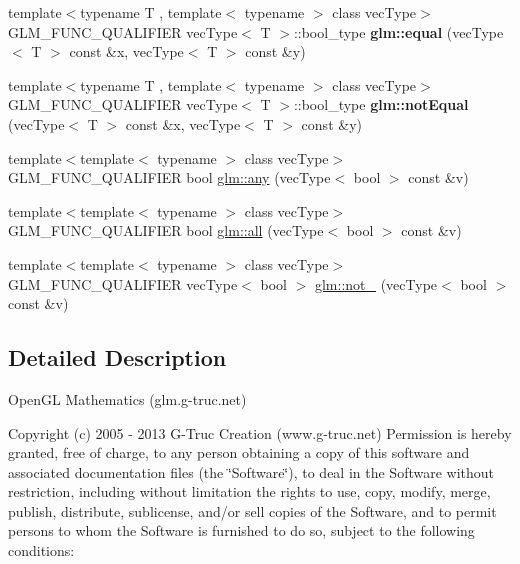 \begin{DoxyCompactItemize}
\item 
\hypertarget{namespaceglm_a8174e161228847c68ded7a51742425e7}{}{\footnotesize template$<$typename T , template$<$ typename $>$ class vec\+Type$>$ }\\G\+L\+M\+\_\+\+F\+U\+N\+C\+\_\+\+Q\+U\+A\+L\+I\+F\+I\+E\+R vec\+Type$<$ T $>$\+::bool\+\_\+type {\bfseries glm\+::equal} (vec\+Type$<$ T $>$ const \&x, vec\+Type$<$ T $>$ const \&y)\label{namespaceglm_a8174e161228847c68ded7a51742425e7}

\item 
\hypertarget{namespaceglm_ab8dd4009e5f297ce53e1132ca4468745}{}{\footnotesize template$<$typename T , template$<$ typename $>$ class vec\+Type$>$ }\\G\+L\+M\+\_\+\+F\+U\+N\+C\+\_\+\+Q\+U\+A\+L\+I\+F\+I\+E\+R vec\+Type$<$ T $>$\+::bool\+\_\+type {\bfseries glm\+::not\+Equal} (vec\+Type$<$ T $>$ const \&x, vec\+Type$<$ T $>$ const \&y)\label{namespaceglm_ab8dd4009e5f297ce53e1132ca4468745}

\item 
{\footnotesize template$<$template$<$ typename $>$ class vec\+Type$>$ }\\G\+L\+M\+\_\+\+F\+U\+N\+C\+\_\+\+Q\+U\+A\+L\+I\+F\+I\+E\+R bool \hyperlink{group__core__func__vector__relational_gacbbe64772c2d950bd806eac4f12f8823}{glm\+::any} (vec\+Type$<$ bool $>$ const \&v)
\item 
{\footnotesize template$<$template$<$ typename $>$ class vec\+Type$>$ }\\G\+L\+M\+\_\+\+F\+U\+N\+C\+\_\+\+Q\+U\+A\+L\+I\+F\+I\+E\+R bool \hyperlink{group__core__func__vector__relational_gab80f9b30c75030155590e429be597601}{glm\+::all} (vec\+Type$<$ bool $>$ const \&v)
\item 
{\footnotesize template$<$template$<$ typename $>$ class vec\+Type$>$ }\\G\+L\+M\+\_\+\+F\+U\+N\+C\+\_\+\+Q\+U\+A\+L\+I\+F\+I\+E\+R vec\+Type$<$ bool $>$ \hyperlink{group__core__func__vector__relational_ga1afa54b03efff3035410a36123aeb4bf}{glm\+::not\+\_\+} (vec\+Type$<$ bool $>$ const \&v)
\end{DoxyCompactItemize}


\subsection{Detailed Description}
Open\+G\+L Mathematics (glm.\+g-\/truc.\+net)

Copyright (c) 2005 -\/ 2013 G-\/\+Truc Creation (www.\+g-\/truc.\+net) Permission is hereby granted, free of charge, to any person obtaining a copy of this software and associated documentation files (the \char`\"{}\+Software\char`\"{}), to deal in the Software without restriction, including without limitation the rights to use, copy, modify, merge, publish, distribute, sublicense, and/or sell copies of the Software, and to permit persons to whom the Software is furnished to do so, subject to the following conditions\+:

